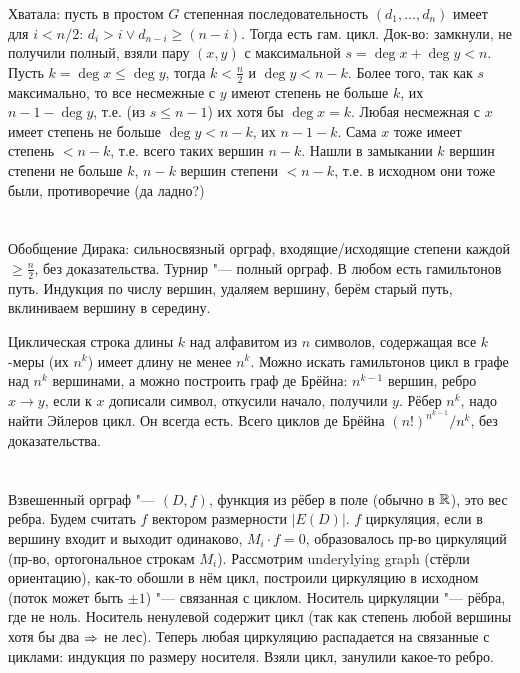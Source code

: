 Хватала: пусть в простом $G$ степенная последовательность $(d_1, \dots, d_n)$ имеет для $i<n/2$:
$d_i>i\lor d_{n-i}\ge(n-i)$.
Тогда есть гам. цикл.
Док-во: замкнули, не получили полный, взяли пару $(x, y)$ с максимальной $s=\deg x + \deg y < n$.
Пусть $k=\deg x \le \deg y$, тогда $k < \frac{n}{2}$ и $\deg y < n-k$.
Более того, так как $s$ максимально, то все несмежные с $y$ имеют степень не больше $k$,
их $n-1-\deg y$, т.е. (из $s \le n-1$) их хотя бы $\deg x = k$.
Любая несмежная с $x$ имеет степень не больше $\deg y < n-k$,
их $n-1-k$.
Сама $x$ тоже имеет степень $< n-k$, т.е. всего таких вершин $n-k$.
Нашли в замыкании $k$ вершин степени не больше $k$, $n-k$ вершин степени $<n-k$,
т.е. в исходном они тоже были, противоречие (\TODO да ладно?)

\section{} %
Обобщение Дирака: сильносвязный орграф, входящие/исходящие степени каждой $\ge \frac{n}{2}$,
без доказательства.
Турнир "--- полный орграф.
В любом есть гамильтонов путь.
Индукция по числу вершин, удаляем вершину, берём старый путь, вклиниваем вершину в середину.

Циклическая строка длины $k$ над алфавитом из $n$ символов, содержащая все
$k$-меры (их $n^k$) имеет длину не менее $n^k$.
Можно искать гамильтонов цикл в графе над $n^k$ вершинами,
а можно построить граф де Брёйна: $n^{k-1}$ вершин, ребро $x \to y$,
если к $x$ дописали символ, откусили начало, получили $y$.
Рёбер $n^k$, надо найти Эйлеров цикл.
Он всегда есть.
Всего циклов де Брёйна $(n!)^{n^{k-1}}/n^k$, без доказательства.

\section{} %
Взвешенный орграф "--- $(D, f)$, функция из рёбер в поле (обычно в $\mathbb{R}$), это вес ребра.
Будем считать $f$ вектором размерности $|E(D)|$.
$f$ циркуляция, если в вершину входит и выходит одинаково, $M_i \cdot f = 0$,
образовалось пр-во циркуляций (пр-во, ортогональное строкам $M_i$).
Рассмотрим underylying graph (стёрли ориентацию), как-то обошли в нём цикл,
построили циркуляцию в исходном (поток может быть $\pm 1$) "--- связанная с циклом.
Носитель циркуляции "--- рёбра, где не ноль.
Носитель ненулевой содержит цикл (так как степень любой вершины хотя бы два $\Rightarrow$ не лес).
Теперь любая циркуляцию распадается на связанные с циклами: индукция по размеру носителя.
Взяли цикл, занулили какое-то ребро.

